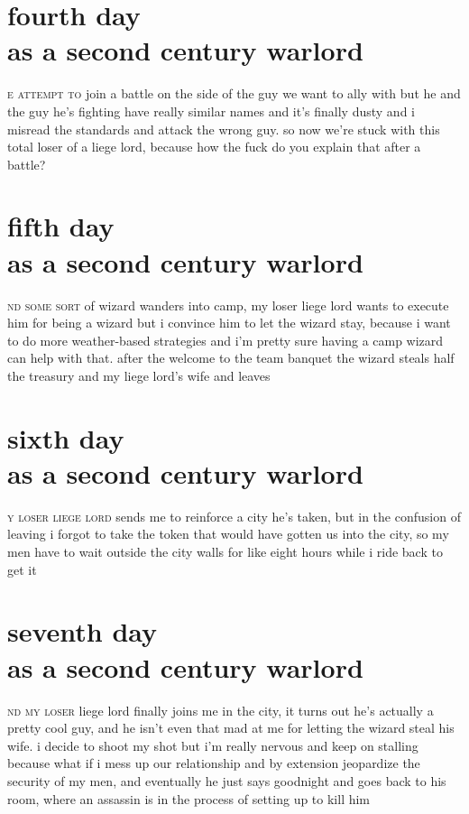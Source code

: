 \documentclass[smalldemyvopaper,11pt,twoside,onecolumn,openany,extrafontsizes]{memoir}
\newlength\drop
\begin{document}
\chapter{fourth day\\as a second century warlord}

\lettrine[lhang=0.2,lines=3,slope=-3pt,findent=-2pt]{}{e attempt to} join a battle on
the side of the guy we want to ally with but he and the guy he's fighting
have really similar names and it's finally dusty and i misread the standards
and attack the wrong guy.  so now we're stuck with this total loser of a
liege lord, because how the fuck do you explain that after a battle?

\chapter{fifth day\\as a second century warlord}

\lettrine[lhang=0.2,lines=3,findent=0pt]{}{nd some sort}
of wizard wanders into camp, my loser liege lord wants to execute him for
being a wizard but i convince him to let the wizard stay, because i want
to do more weather-based strategies and i'm pretty sure having a camp
wizard can help with that.  after the welcome to the team banquet the wizard
steals half the treasury and my liege lord's wife and leaves

\chapter{sixth day\\as a second century warlord}

\lettrine[lhang=0.2,lines=3,findent=-2pt]{}{y loser liege lord}
sends me to reinforce a city he's taken, but in the confusion of leaving i
forgot to take the token that would have gotten us into the city, so my men
have to wait outside the city walls for like eight hours while i ride
back to get it

\chapter{seventh day\\as a second century warlord}

\lettrine[lhang=0.2,lines=3,findent=0pt]{}{nd my loser} liege lord
finally joins me in the city, it turns out he's actually a pretty cool guy, and
he isn't even that mad at me for letting the wizard steal his wife. i decide to
shoot my shot but i'm really nervous and keep on stalling because what if i
mess up our relationship and by extension jeopardize the security of my men,
and eventually he just says goodnight and goes back to his room, where an
assassin is in the process of setting up to kill him
\end{document}
